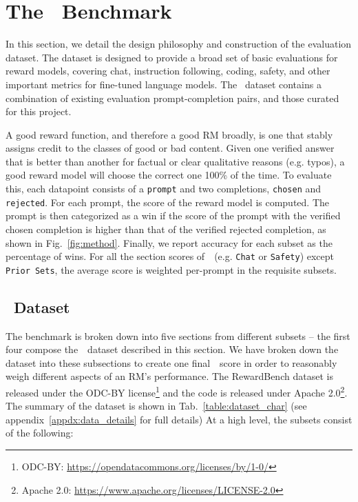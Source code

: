 
\section{The \name~Benchmark}
\label{sec:methods}

In this section, we detail the design philosophy and construction of the evaluation dataset.
The dataset is designed to provide a broad set of basic evaluations for reward models, covering chat, instruction following, coding, safety, and other important metrics for fine-tuned language models.
The \name~dataset contains a combination of existing evaluation prompt-completion pairs, and those curated for this project.

A good reward function, and therefore a good RM broadly, is one that stably assigns credit to the classes of good or bad content.%
Given one verified answer that is better than another for factual or clear qualitative reasons (e.g. typos), a good reward model will choose the correct one 100\% of the time.
To evaluate this, each datapoint consists of a \texttt{prompt} and two completions, \texttt{chosen} and \texttt{rejected}.
For each prompt, the score of the reward model is computed. The prompt is then categorized as a win if the score of the prompt with the verified chosen completion is higher than that of the verified rejected completion, as shown in Fig.~\ref{fig:method}.
Finally, we report accuracy for each subset as the percentage of wins. 
For all the section scores of~\name~(e.g. \texttt{Chat} or \texttt{Safety}) except \texttt{Prior Sets}, the average score is weighted per-prompt in the requisite subsets.

\subsection{\name~Dataset}
\label{sec:subsets}

The benchmark is broken down into five sections from different subsets -- the first four compose the~\name~dataset described in this section.
We have broken down the dataset into these subsections to create one final~\name~score in order to reasonably weigh different aspects of an RM's performance.
The RewardBench dataset is released under the ODC-BY license\footnote{ODC-BY: \url{https://opendatacommons.org/licenses/by/1-0/}} and the code is released under Apache 2.0\footnote{Apache 2.0: \url{https://www.apache.org/licenses/LICENSE-2.0}}.
The summary of the dataset is shown in Tab.~\ref{table:dataset_char} (see appendix~\ref{appdx:data_details} for full details) At a high level, the subsets consist of the following:

